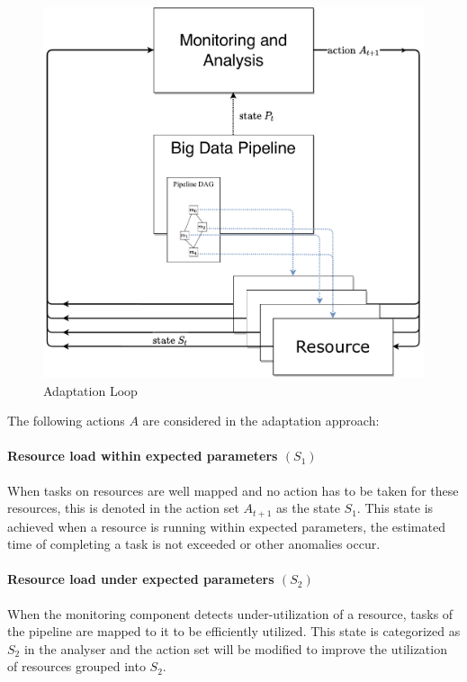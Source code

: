   \begin{figure}[h!]
    \centering
     \includegraphics[width=\columnwidth]{figures/monitoring_with_inner_resources.drawio.pdf}
    \caption{Adaptation Loop}
    \label{fig:adaptation-loop}
\end{figure}
The following actions $A$ are considered in the adaptation approach:

\paragraph*{Resource load within expected parameters $(S_1)$} 
When tasks on resources are well mapped and no action has to be taken for these resources, this is denoted in the action set $A_{t+1}$ as the state $S_1$. This state is achieved when a resource is running within expected parameters, the estimated time of completing a task is not exceeded or other anomalies occur.

\paragraph*{Resource load under expected parameters $(S_2)$} 
When the monitoring component detects under-utilization of a resource, tasks of the pipeline are mapped to it to be efficiently utilized. This state is categorized as $S_2$ in the analyser and the action set will be modified to improve the utilization of resources grouped into $S_2$. 

